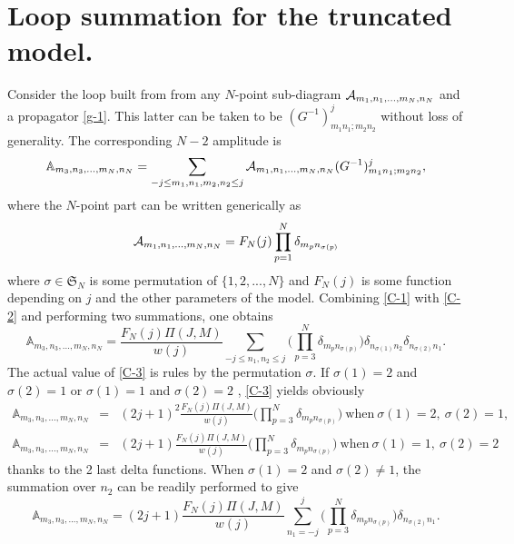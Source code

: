 \documentclass[a4paper,11pt,twoside]{article}
\numberwithin{equation}{section}
\theoremstyle{nonumberplain}
\newcounter{and}
\begin{document}
\section{Loop summation for the truncated model.}\label{appendix3}
Consider the loop built from from any $N$-point sub-diagram ${\cal{A}}_{m_1,n_1,...,m_N,n_N}$ and a propagator \eqref{g-1}. This latter can be taken to be $(G^{-1})^j_{m_1n_1;m_2n_2}$ without loss of generality. The corresponding $N-2$ amplitude is
\begin{equation}
\mathbb{A}_{m_3,n_3,...,m_N,n_N}=\sum_{-j\le m_1,n_1,m_2,n_2\le j}{\cal{A}}_{m_1,n_1,...,m_N,n_N}(G^{-1})^j_{m_1n_1;m_2n_2}\label{C-1},
\end{equation}
where the $N$-point part can be written generically as
\begin{equation}
{\cal{A}}_{m_1,n_1,...,m_N,n_N}=F_N(j)\prod_{p=1}^N\delta_{m_pn_{\sigma(p)}}\label{C-2}
\end{equation}
where $\sigma\in\mathfrak{S}_{N}$ is some permutation of $\{1,2,...,N \}$ and $F_N(j)$ is some function depending on $j$ and the other parameters of the model. Combining \eqref{C-1} with \eqref{C-2} and performing two summations, one obtains
\begin{equation}
\mathbb{A}_{m_3,n_3,...,m_N,n_N}=\frac{F_N(j)\Pi(J,M)}{w(j)}\sum_{-j\le n_1,n_2\le j}\big(\prod_{p=3}^N \delta_{m_pn_{\sigma(p)}}\big)\delta_{n_{\sigma(1)}n_2}\delta_{n_{\sigma(2)}n_1}\label{C-3}.
\end{equation}
The actual value of \eqref{C-3} is rules by the permutation $\sigma$. If $\sigma(1)=2$ and $\sigma(2)=1$ or $\sigma(1)=1$ and $\sigma(2)=2$ , \eqref{C-3} yields obviously
\begin{eqnarray}
\mathbb{A}_{m_3,n_3,...,m_N,n_N}&=&(2j+1)^2\frac{F_N(j)\Pi(J,M)}{w(j)}\big(\prod_{p=3}^N \delta_{m_pn_{\sigma(p)}}\big)\ {\text{when}}\ \sigma(1)=2,\ \sigma(2)=1\label{C-4},\\
\mathbb{A}_{m_3,n_3,...,m_N,n_N}&=&(2j+1)\frac{F_N(j)\Pi(J,M)}{w(j)}\big(\prod_{p=3}^N \delta_{m_pn_{\sigma(p)}}\big)\ {\text{when}}\ \sigma(1)=1,\ \sigma(2)=2\label{C-5}
\end{eqnarray}
thanks to the 2 last delta functions. When $\sigma(1)=2$ and $\sigma(2)\ne1$, the summation over $n_2$ can be readily performed to give
\begin{equation}
\mathbb{A}_{m_3,n_3,...,m_N,n_N}=(2j+1)\frac{F_N(j)\Pi(J,M)}{w(j)}\sum_{n_1=-j}^j\big(\prod_{p=3}^N \delta_{m_pn_{\sigma(p)}}\big)\delta_{n_{\sigma(2)}n_1}\label{C-6}.
\end{equation}
\end{document}
